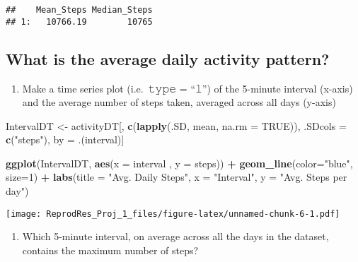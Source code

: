 \documentclass[
]{article}
\newenvironment{Shaded}{\begin{snugshade}}{\end{snugshade}}
\newcommand{\DataTypeTok}[1]{\textcolor[rgb]{0.13,0.29,0.53}{#1}}
\newcommand{\DecValTok}[1]{\textcolor[rgb]{0.00,0.00,0.81}{#1}}
\newcommand{\KeywordTok}[1]{\textcolor[rgb]{0.13,0.29,0.53}{\textbf{#1}}}
\newcommand{\NormalTok}[1]{#1}
\newcommand{\OperatorTok}[1]{\textcolor[rgb]{0.81,0.36,0.00}{\textbf{#1}}}
\newcommand{\OtherTok}[1]{\textcolor[rgb]{0.56,0.35,0.01}{#1}}
\newcommand{\StringTok}[1]{\textcolor[rgb]{0.31,0.60,0.02}{#1}}
\providecommand{\tightlist}{%
  \setlength{\itemsep}{0pt}\setlength{\parskip}{0pt}}
\begin{document}
\begin{verbatim}
##    Mean_Steps Median_Steps
## 1:   10766.19        10765
\end{verbatim}

\hypertarget{what-is-the-average-daily-activity-pattern}{%
\subsection{What is the average daily activity
pattern?}\label{what-is-the-average-daily-activity-pattern}}

\begin{enumerate}
\def\labelenumi{\arabic{enumi}.}
\tightlist
\item
  Make a time series plot (i.e.~𝚝𝚢𝚙𝚎 = ``𝚕'') of the 5-minute interval
  (x-axis) and the average number of steps taken, averaged across all
  days (y-axis)
\end{enumerate}

\begin{Shaded}
\begin{Highlighting}[]
\NormalTok{IntervalDT <-}\StringTok{ }\NormalTok{activityDT[, }\KeywordTok{c}\NormalTok{(}\KeywordTok{lapply}\NormalTok{(.SD, mean, }\DataTypeTok{na.rm =} \OtherTok{TRUE}\NormalTok{)), .SDcols =}\StringTok{ }\KeywordTok{c}\NormalTok{(}\StringTok{"steps"}\NormalTok{), by =}\StringTok{ }\NormalTok{.(interval)] }

\KeywordTok{ggplot}\NormalTok{(IntervalDT, }\KeywordTok{aes}\NormalTok{(}\DataTypeTok{x =}\NormalTok{ interval , }\DataTypeTok{y =}\NormalTok{ steps)) }\OperatorTok{+}\StringTok{ }
\StringTok{  }\KeywordTok{geom_line}\NormalTok{(}\DataTypeTok{color=}\StringTok{"blue"}\NormalTok{, }\DataTypeTok{size=}\DecValTok{1}\NormalTok{) }\OperatorTok{+}\StringTok{ }
\StringTok{  }\KeywordTok{labs}\NormalTok{(}\DataTypeTok{title =} \StringTok{"Avg. Daily Steps"}\NormalTok{, }\DataTypeTok{x =} \StringTok{"Interval"}\NormalTok{, }\DataTypeTok{y =} \StringTok{"Avg. Steps per day"}\NormalTok{)}
\end{Highlighting}
\end{Shaded}

\texttt{[image: ReprodRes\_Proj\_1\_files/figure-latex/unnamed-chunk-6-1.pdf]}

\begin{enumerate}
\def\labelenumi{\arabic{enumi}.}
\setcounter{enumi}{1}
\tightlist
\item
  Which 5-minute interval, on average across all the days in the
  dataset, contains the maximum number of steps?
\end{enumerate}
\end{document}
